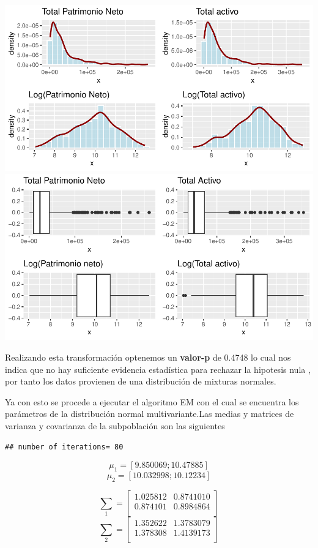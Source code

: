 \documentclass[
]{article}
\begin{document}
\includegraphics{CODIGO_PROYECTO_EM_files/figure-latex/unnamed-chunk-3-1.pdf}
\includegraphics{CODIGO_PROYECTO_EM_files/figure-latex/unnamed-chunk-3-2.pdf}

Realizando esta transformación optenemos un \textbf{valor-p} de 0.4748
lo cual nos indica que no hay suficiente evidencia estadística para
rechazar la hipotesis nula , por tanto los datos provienen de una
distribución de mixturas normales.

Ya con esto se procede a ejecutar el algoritmo EM con el cual se
encuentra los parámetros de la distribución normal multivariante.Las
medias y matrices de varianza y covarianza de la subpoblación son las
siguientes

\begin{verbatim}
## number of iterations= 80
\end{verbatim}

\[\mu_1=[9.850069 ;10.47885]\] \[\mu_2=[10.032998; 10.12234]\]

\[
\sum_1 = \begin{bmatrix}
   1.025812 & 0.8741010 \\
   0.874101& 0.8984864 \\
\end{bmatrix}
\] \[
\sum_2 = \begin{bmatrix}
   1.352622 & 1.3783079 \\
   1.378308 & 1.4139173  \\
\end{bmatrix}
\]
\end{document}
